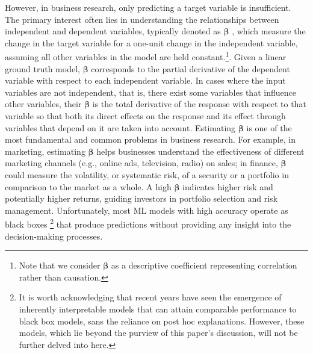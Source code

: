 \documentclass[mnsc,blindrev]{informs3}
\begin{document}
However, in business research, only predicting a target variable is insufficient. The primary interest often lies in understanding the relationships between independent and dependent variables, typically denoted as $\boldsymbol{\beta}$ \citep{angrist2009mostly}, which measure the change in the target variable for a one-unit change in the independent variable, assuming all other variables in the model are held constant.\footnote{Note that we consider $\boldsymbol{\beta}$ as a descriptive coefficient representing correlation rather than causation.}. Given a linear ground truth model, $\boldsymbol{\beta}$ corresponds to the partial derivative of the dependent variable with respect to each independent variable. In cases where the input variables are not independent, that is, there exist some variables that influence other variables, their $\boldsymbol{\beta}$ is the total derivative of the response with respect to that variable so that both its direct effects on the response and its effect through variables that depend on it are taken into account. %
Estimating $\boldsymbol{\beta}$ is one of the most fundamental and common problems in business research. For example, in marketing, estimating $\boldsymbol{\beta}$ helps businesses understand the effectiveness of different marketing channels (e.g., online ads, television, radio) on sales; in finance,  $\boldsymbol{\beta}$ could measure the volatility, or systematic risk, of a security or a portfolio in comparison to the market as a whole. A high $\boldsymbol{\beta}$ indicates higher risk and potentially higher returns, guiding investors in portfolio selection and risk management.  %
Unfortunately, most ML models with high accuracy operate as black boxes \footnote{It is worth acknowledging that recent years have seen the emergence of inherently interpretable models that can attain comparable performance to black box models, sans the reliance on post hoc explanations. However, these models, which lie beyond the purview of this paper's discussion, will not be further delved into here.} that produce predictions without providing any insight into the decision-making processes.
\end{document}
